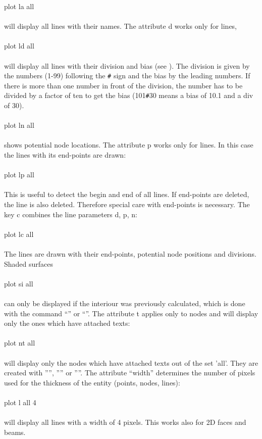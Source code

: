 \documentclass{article}
\begin{document}
plot la all\\\\will display all lines with their names. The attribute d works only for lines,\\\\plot ld all\\\\ will display all lines with their division and bias (see ). The division is given by the numbers (1-99) following the \verb_#_ sign and the bias by the leading numbers. If there is more than one number in front of the division, the number has to be divided by a factor of ten to get the bias (101\verb_#_30 means a bias of 10.1 and a div of 30). \\\\plot ln all\\\\shows potential node locations. The attribute p works only for lines. In this case the lines with its end-points are drawn:\\\\plot lp all\\\\This is useful to detect the begin and end of all lines. If end-points are deleted, the line is also deleted. Therefore special care with end-points is necessary. The key c combines the line parameters d, p, n:\\\\plot lc all\\\\The lines are drawn with their end-points, potential node positions and divisions.
Shaded surfaces\\\\plot si all\\\\ can only be displayed if the interiour was previously calculated, which is done with the command ``'' or ``''. The attribute t applies only to nodes and will display only the ones which have attached texts:\\\\plot nt all\\\\will display only the nodes which have attached texts out of the set 'all'. They are created with '''', '''' or ''''. The attribute ``width'' determines the number of pixels used for the thickness of the entity (points, nodes, lines):\\\\plot l all 4\\\\will display all lines with a width of 4 pixels. This works also for 2D faces and beams.
\end{document}
